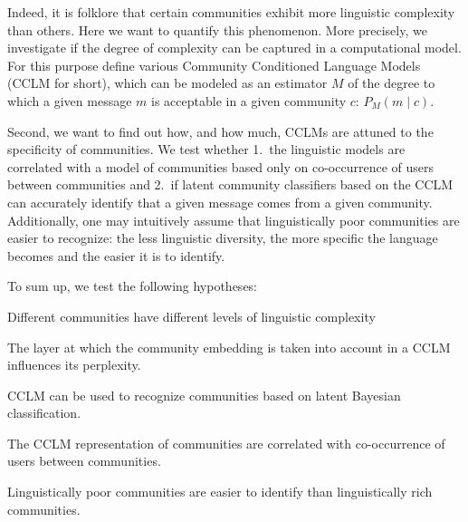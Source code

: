 \documentclass[11pt]{article}
\begin{document}
%
Indeed, it is folklore that certain communities exhibit more
linguistic complexity than others.  Here we want to quantify this
phenomenon.  More precisely, we investigate if the degree of
complexity can be captured in a computational model.  For this purpose
define various Community Conditioned Language Models (CCLM for short),
which can be modeled as an estimator $M$ of the degree to which a
given message $m$ is acceptable in a given community $c$:
\(P_M(m \mid c)\).

Second, we want to find out how, and how much, CCLMs are attuned to
the specificity of communities. We test whether 1.\ the linguistic
models are correlated with a model of communities based only on
co-occurrence of users between communities and 2.\ if latent community
classifiers based on the CCLM can accurately identify that a given
message comes from a given community. Additionally, one may
intuitively assume that linguistically poor communities are easier to
recognize: the less linguistic diversity, the more specific the
language becomes and the easier it is to identify.

To sum up, we test the following hypotheses:
\begin{hypotheses}
\item \label{hyp:varying-complexity} Different communities have different levels of linguistic
  complexity
\item \label{hyp:layer-effect} The layer at which the community embedding is taken into account
  in a CCLM influences its perplexity.
\item \label{hyp:LMCC-works} CCLM can be used to recognize communities based on
  latent Bayesian classification.
\item \label{hyp:extra-linguistic-correlation} The CCLM representation of communities are correlated with
  co-occurrence of users between communities.
\item \label{hyp:rich-harder-to-identify} Linguistically poor communities are easier to identify than
  linguistically rich communities.
\end{hypotheses}
\end{document}
